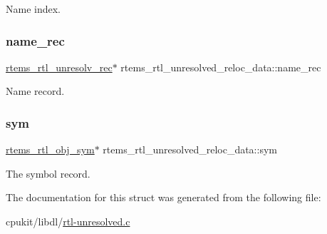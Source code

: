 Name index. \mbox{\label{structrtems__rtl__unresolved__reloc__data_ad84833d353b2a92ebf37261a041ccb02}} 
\subsubsection{\texorpdfstring{name\_rec}{name\_rec}}
{\footnotesize\ttfamily \mbox{\hyperlink{structrtems__rtl__unresolv__rec}{rtems\+\_\+rtl\+\_\+unresolv\+\_\+rec}}$\ast$ rtems\+\_\+rtl\+\_\+unresolved\+\_\+reloc\+\_\+data\+::name\+\_\+rec}

Name record. \mbox{\label{structrtems__rtl__unresolved__reloc__data_a59d505cd0f42bf16ca02574abfe280be}} 
\subsubsection{\texorpdfstring{sym}{sym}}
{\footnotesize\ttfamily \mbox{\hyperlink{structrtems__rtl__obj__sym}{rtems\+\_\+rtl\+\_\+obj\+\_\+sym}}$\ast$ rtems\+\_\+rtl\+\_\+unresolved\+\_\+reloc\+\_\+data\+::sym}

The symbol record. 

The documentation for this struct was generated from the following file\+:\begin{DoxyCompactItemize}
\item 
cpukit/libdl/\mbox{\hyperlink{rtl-unresolved_8c}{rtl-\/unresolved.\+c}}\end{DoxyCompactItemize}
